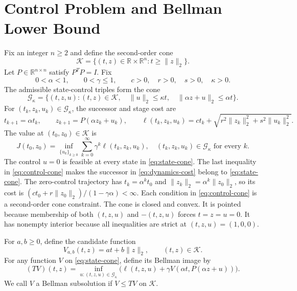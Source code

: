 \documentclass[10pt]{article}
\newcommand{\R}{\mathbb R}
\begin{document}
\section{Control Problem and Bellman Lower Bound}

Fix an integer $n\geq2$ and define the second-order cone
\begin{equation}
\mathcal K=\{(t,z)\in\R\times\R^n:t\geq\|z\|_2\}.
\label{eq:state-cone}
\end{equation}
Let $P\in\R^{n\times n}$ satisfy $P^TP=I$. Fix
\begin{equation}
0<\alpha<1,\qquad 0<\gamma\leq1,\qquad
c>0,\quad r>0,\quad s>0,\quad\kappa>0.
\label{eq:data}
\end{equation}
The admissible state-control triples form the cone
\begin{equation}
\mathcal G_\kappa=\{(t,z,u):(t,z)\in\mathcal K,\quad
\|u\|_2\leq\kappa t,\quad
\|\alpha z+u\|_2\leq\alpha t\}.
\label{eq:control-cone}
\end{equation}
For $(t_k,z_k,u_k)\in\mathcal G_\kappa$, the successor and stage cost are
\begin{equation}
t_{k+1}=\alpha t_k,\qquad
z_{k+1}=P(\alpha z_k+u_k),\qquad
\ell(t_k,z_k,u_k)=c t_k+
\sqrt{r^2\|z_k\|_2^2+s^2\|u_k\|_2^2}.
\label{eq:dynamics-cost}
\end{equation}
The value at $(t_0,z_0)\in\mathcal K$ is
\begin{equation}
J(t_0,z_0)=\inf_{\{u_k\}_{k\geq0}}
\sum_{k=0}^{\infty}\gamma^k\ell(t_k,z_k,u_k),
\quad (t_k,z_k,u_k)\in\mathcal G_\kappa\text{ for every }k.
\label{eq:value}
\end{equation}
The control $u=0$ is feasible at every state in \eqref{eq:state-cone}. The last inequality in \eqref{eq:control-cone} makes the successor in \eqref{eq:dynamics-cost} belong to \eqref{eq:state-cone}. The zero-control trajectory has $t_k=\alpha^kt_0$ and $\|z_k\|_2=\alpha^k\|z_0\|_2$, so its cost is $(ct_0+r\|z_0\|_2)/(1-\gamma\alpha)<\infty$. Each condition in \eqref{eq:control-cone} is a second-order cone constraint. The cone is closed and convex. It is pointed because membership of both $(t,z,u)$ and $-(t,z,u)$ forces $t=z=u=0$. It has nonempty interior because all inequalities are strict at $(t,z,u)=(1,0,0)$.

For $a,b\geq0$, define the candidate function
\begin{equation}
V_{a,b}(t,z)=a t+b\|z\|_2,\qquad (t,z)\in\mathcal K.
\label{eq:candidate}
\end{equation}
For any function $V$ on \eqref{eq:state-cone}, define its Bellman image by
\begin{equation}
(TV)(t,z)=\inf_{u:(t,z,u)\in\mathcal G_\kappa}
\bigl(\ell(t,z,u)+\gamma V(\alpha t,P(\alpha z+u))\bigr).
\label{eq:bellman-operator}
\end{equation}
We call $V$ a Bellman subsolution if $V\leq TV$ on $\mathcal K$.
\end{document}
